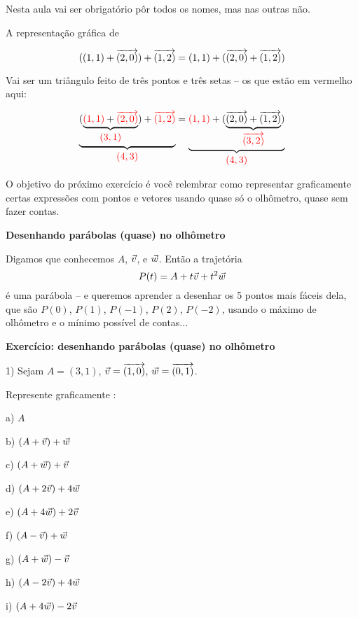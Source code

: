 \documentclass[oneside,12pt]{article}
\begin{document}
\msk

Nesta aula vai ser obrigatório pôr todos os nomes, mas nas outras não.

\newpage

A representação gráfica de

\def\und#1#2{\underbrace{#1}_{\textstyle#2}}
\def\Red#1{\ColorRed{#1}}

$$((1,1) + {\overrightarrow{(2,0)}}) + {\overrightarrow{(1,2)}} = (1,1) + ({\overrightarrow{(2,0)}} + {\overrightarrow{(1,2)}})$$

Vai ser um triângulo feito de três pontos e três setas -- os que estão
em vermelho aqui:

$$\und{(\und{\Red{(1,1)} + \Red{\VEC{2,0}}}{\Red{(3,1)}}) + \Red{\VEC{1,2}}}{\Red{(4,3)}} =
  \und{\Red{(1,1)} + (\und{\VEC{2,0} + \VEC{1,2}}{\Red{\VEC{3,2}}})}{\Red{(4,3)}}
$$

O objetivo do próximo exercício é você relembrar como representar
graficamente certas expressões com pontos e vetores usando quase só o
olhômetro, quase sem fazer contas.


\newpage

{\bf Desenhando parábolas (quase) no olhômetro}

Digamos que conhecemos $A$, ${\vec v}$, e ${\vec w}$. Então a trajetória
%
$$P(t) = A + t{\vec v} + t^2{\vec w}$$
%
é uma parábola -- e queremos aprender a desenhar os 5 pontos mais
fáceis dela, que são $P(0)$, $P(1)$, $P(-1)$, $P(2)$, $P(-2)$, usando
o máximo de olhômetro e o mínimo possível de contas...

\msk



\newpage


{\bf Exercício: desenhando parábolas (quase) no olhômetro}

1) Sejam $A=(3,1)$, ${\vec v} = {\overrightarrow{(1,0)}}$, ${\vec w} = {\overrightarrow{(0,1)}}$.

Represente graficamente :

a) $A$

b) $(A+{\vec v})+{\vec w}$

c) $(A+{\vec w})+{\vec v}$

d) $(A+2{\vec v})+4{\vec w}$

e) $(A+4{\vec w})+2{\vec v}$

f) $(A-{\vec v})+{\vec w}$

g) $(A+{\vec w})-{\vec v}$

h) $(A-2{\vec v})+4{\vec w}$

i) $(A+4{\vec w})-2{\vec v}$
\end{document}
